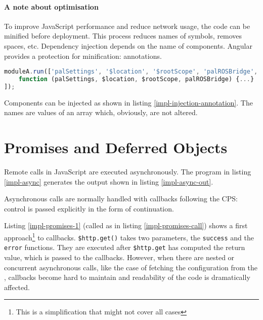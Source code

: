 \paragraph{A note about optimisation} To improve JavaScript performance and reduce network usage, the code can be minified before deployment.
This process reduces names of symbols, removes spaces, etc.
Dependency injection depends on the name of components. 
Angular provides a protection for minification: annotations.
\begin{lstlisting}[caption=Annotations to protect injection, language=javascript, label=impl-injection-annotation]
moduleA.run(['palSettings', '$location', '$rootScope', 'palROSBridge', 
    function (palSettings, $location, $rootScope, palROSBridge) {...} 
]);

\end{lstlisting}
Components can be injected as shown in listing \ref{impl-injection-annotation}.
The names are values of an array which, obviously, are not altered.

\section{Promises and Deferred Objects}
Remote calls in JavaScript are executed asynchronously.
The program in listing \ref{impl-async} generates the output shown in listing \ref{impl-async-out}.




Asynchronous calls are normally handled with callbacks following the \ac{CPS}: control is passed explicitly in the form of continuation.





Listing \ref{impl-promises-1} (called as in listing \ref{impl-promises-call}) shows a first approach\footnote{This is a simplification that might not cover all cases} to callbacks.
\texttt{\$http.get()} takes two parameters, the \texttt{success} and the \texttt{error} functions. 
They are executed after \texttt{\$http.get} has computed the return value, which is passed to the callbacks.
However, when there are nested or concurrent asynchronous calls, like the case of fetching the configuration from the \flangobe , callbacks become hard to maintain and readability of the code is dramatically affected.

